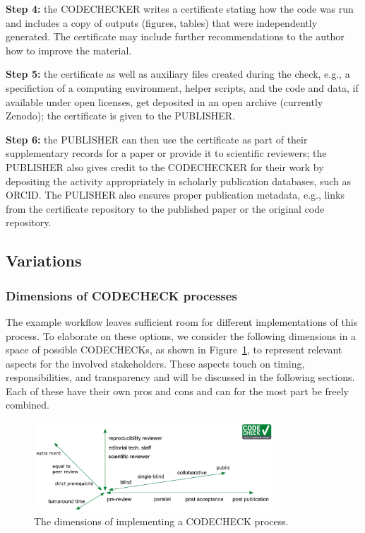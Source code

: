 \documentclass[12pt]{article}
\begin{document}
\textbf{Step 4:} the CODECHECKER writes a certificate stating how the code was
run and includes a copy of outputs (figures, tables) that were
independently generated. The certificate may include further recommendations to
the author how to improve the material.

\textbf{Step 5:} the certificate as well as auxiliary files created during the check,
e.g., a specifiction of a computing environment, helper scripts, and the code and data,
if available under open licenses, get deposited in an open archive (currently Zenodo);
the certificate is given to the PUBLISHER.

\textbf{Step 6:} the PUBLISHER can then use the certificate as part of their
supplementary records for a paper or provide it to scientific reviewers; the
PUBLISHER also gives credit to the CODECHECKER for their work by depositing the
activity appropriately in scholarly publication databases, such as ORCID.
The PULISHER also ensures proper publication metadata, e.g., links from the 
certificate repository to the published paper or the original code repository.

\subsection*{Variations}\label{variations}

\subsubsection*{Dimensions of CODECHECK processes}\label{dimensions-of-processes}

The example workflow leaves sufficient room for different
implementations of this process. To elaborate on these options, we consider
the following dimensions in a space of possible CODECHECKs, as shown in 
Figure~\ref{fig:dimensions}, to represent relevant aspects for the involved
stakeholders. These aspects touch on timing, responsibilities, and 
transparency and will be discussed in the following sections.
Each of these have their own pros and cons and can for the most part be
freely combined.

\begin{figure}
  \centering
      \includegraphics[width=0.8\textwidth]{figs/codecheck_dimensions.pdf}
  \caption{The dimensions of implementing a CODECHECK process.}
  \label{fig:dimensions}
\end{figure}
\end{document}
